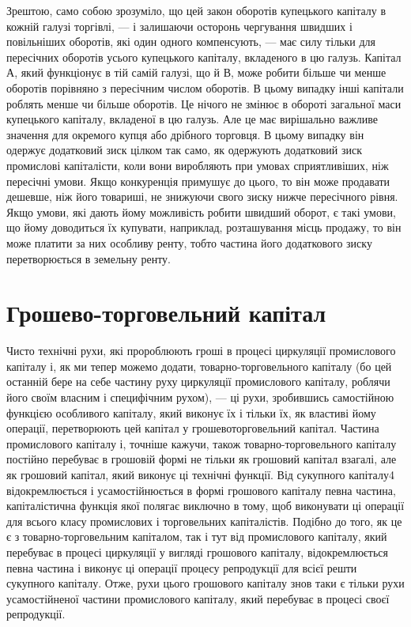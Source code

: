 Зрештою, само собою зрозуміло, що цей закон оборотів купецького
капіталу в кожній галузі торгівлі, — і залишаючи осторонь
чергування швидших і повільніших оборотів, які один одного компенсують,
— має силу тільки для пересічних оборотів усього купецького
капіталу, вкладеного в цю галузь. Капітал $А$, який функціонує
в тій самій галузі, що й $В$, може робити більше чи менше оборотів
порівняно з пересічним числом оборотів. В цьому випадку
інші капітали роблять менше чи більше оборотів. Це нічого не
змінює в обороті загальної маси купецького капіталу, вкладеної
в цю галузь. Але це має вирішально важливе значення для окремого
купця або дрібного торговця. В цьому випадку він одержує
додатковий зиск цілком так само, як одержують додатковий зиск
промислові капіталісти, коли вони виробляють при умовах сприятливіших,
ніж пересічні умови. Якщо конкуренція примушує до
цього, то він може продавати дешевше, ніж його товариші, не
знижуючи свого зиску нижче пересічного рівня. Якщо умови,
які дають йому можливість робити швидший оборот, є такі
умови, що йому доводиться їх купувати, наприклад, розташування
місць продажу, то він може платити за них особливу ренту,
тобто частина його додаткового зиску перетворюється в земельну
ренту.

\section{Грошево-торговельний капітал}

Чисто технічні рухи, які пророблюють гроші в процесі циркуляції
промислового капіталу і, як ми тепер можемо додати,
товарно-торговельного капіталу (бо цей останній бере на себе
частину руху циркуляції промислового капіталу, роблячи його
своїм власним і специфічним рухом), — ці рухи, зробившись самостійною
функцією особливого капіталу, який виконує їх і тільки їх,
як властиві йому операції, перетворюють цей капітал у грошевоторговельний
капітал. Частина промислового капіталу і, точніше
кажучи, також товарно-торговельного капіталу постійно перебуває
в грошовій формі не тільки як грошовий капітал взагалі, але
як грошовий капітал, який виконує ці технічні функції. Від сукупного
капіталу4 відокремлюється і усамостійнюється в формі грошового
капіталу певна частина, капіталістична функція якої
полягає виключно в тому, щоб виконувати ці операції для всього
класу промислових і торговельних капіталістів. Подібно до того,
як це є з товарно-торговельним капіталом, так і тут від промислового
капіталу, який перебуває в процесі циркуляції у вигляді
грошового капіталу, відокремлюється певна частина і виконує
ці операції процесу репродукції для всієї решти сукупного капіталу.
Отже, рухи цього грошового капіталу знов таки є тільки
рухи усамостійненої частини промислового капіталу, який перебуває
в процесі своєї репродукції.


